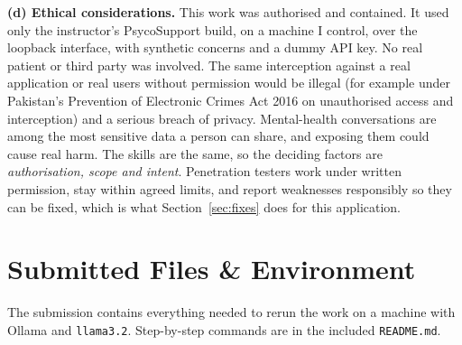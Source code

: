 \documentclass[11pt,a4paper]{article}
\DeclareRobustCommand{\_}{\textunderscore\allowbreak}  %
\newcommand{\ct}[1]{\texttt{#1}}
\begin{document}
\textbf{(d) Ethical considerations.}
This work was authorised and contained. It used only the instructor's PsycoSupport build, on a machine I control,
over the loopback interface, with synthetic concerns and a dummy API key. No real patient or third party was
involved. The same interception against a real application or real users without permission would be illegal (for
example under Pakistan's Prevention of Electronic Crimes Act 2016 on unauthorised access and interception) and a
serious breach of privacy. Mental-health conversations are among the most sensitive data a person can share, and
exposing them could cause real harm. The skills are the same, so the deciding factors are \emph{authorisation, scope
and intent}. Penetration testers work under written permission, stay within agreed limits, and report weaknesses
responsibly so they can be fixed, which is what Section~\ref{sec:fixes} does for this application.

\section{Submitted Files \& Environment}

The submission contains everything needed to rerun the work on a machine with Ollama and \ct{llama3.2}. Step-by-step
commands are in the included \ct{README.md}.
\end{document}
